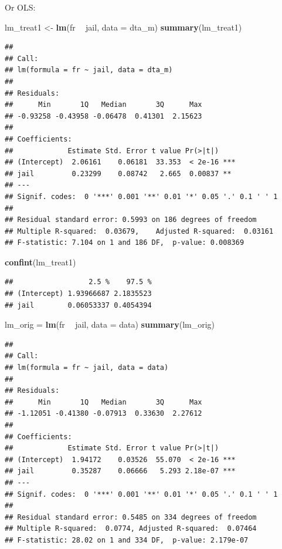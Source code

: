 \documentclass[]{article}
\newenvironment{Shaded}{\begin{snugshade}}{\end{snugshade}}
\newcommand{\DataTypeTok}[1]{\textcolor[rgb]{0.13,0.29,0.53}{#1}}
\newcommand{\KeywordTok}[1]{\textcolor[rgb]{0.13,0.29,0.53}{\textbf{#1}}}
\newcommand{\NormalTok}[1]{#1}
\newcommand{\OperatorTok}[1]{\textcolor[rgb]{0.81,0.36,0.00}{\textbf{#1}}}
\newcommand{\StringTok}[1]{\textcolor[rgb]{0.31,0.60,0.02}{#1}}
\begin{document}
Or OLS:

\begin{Shaded}
\begin{Highlighting}[]
\NormalTok{lm_treat1 <-}\StringTok{ }\KeywordTok{lm}\NormalTok{(fr }\OperatorTok{~}\StringTok{ }\NormalTok{jail, }\DataTypeTok{data =}\NormalTok{ dta_m)}
\KeywordTok{summary}\NormalTok{(lm_treat1)}
\end{Highlighting}
\end{Shaded}

\begin{verbatim}
## 
## Call:
## lm(formula = fr ~ jail, data = dta_m)
## 
## Residuals:
##      Min       1Q   Median       3Q      Max 
## -0.93258 -0.43958 -0.06478  0.41301  2.15623 
## 
## Coefficients:
##             Estimate Std. Error t value Pr(>|t|)    
## (Intercept)  2.06161    0.06181  33.353  < 2e-16 ***
## jail         0.23299    0.08742   2.665  0.00837 ** 
## ---
## Signif. codes:  0 '***' 0.001 '**' 0.01 '*' 0.05 '.' 0.1 ' ' 1
## 
## Residual standard error: 0.5993 on 186 degrees of freedom
## Multiple R-squared:  0.03679,    Adjusted R-squared:  0.03161 
## F-statistic: 7.104 on 1 and 186 DF,  p-value: 0.008369
\end{verbatim}

\begin{Shaded}
\begin{Highlighting}[]
\KeywordTok{confint}\NormalTok{(lm_treat1)}
\end{Highlighting}
\end{Shaded}

\begin{verbatim}
##                  2.5 %    97.5 %
## (Intercept) 1.93966687 2.1835523
## jail        0.06053337 0.4054394
\end{verbatim}

\begin{Shaded}
\begin{Highlighting}[]
\NormalTok{lm_orig =}\StringTok{ }\KeywordTok{lm}\NormalTok{(fr }\OperatorTok{~}\StringTok{ }\NormalTok{jail, }\DataTypeTok{data =}\NormalTok{ data)}
\KeywordTok{summary}\NormalTok{(lm_orig)}
\end{Highlighting}
\end{Shaded}

\begin{verbatim}
## 
## Call:
## lm(formula = fr ~ jail, data = data)
## 
## Residuals:
##      Min       1Q   Median       3Q      Max 
## -1.12051 -0.41380 -0.07913  0.33630  2.27612 
## 
## Coefficients:
##             Estimate Std. Error t value Pr(>|t|)    
## (Intercept)  1.94172    0.03526  55.070  < 2e-16 ***
## jail         0.35287    0.06666   5.293 2.18e-07 ***
## ---
## Signif. codes:  0 '***' 0.001 '**' 0.01 '*' 0.05 '.' 0.1 ' ' 1
## 
## Residual standard error: 0.5485 on 334 degrees of freedom
## Multiple R-squared:  0.0774, Adjusted R-squared:  0.07464 
## F-statistic: 28.02 on 1 and 334 DF,  p-value: 2.179e-07
\end{verbatim}
\end{document}
